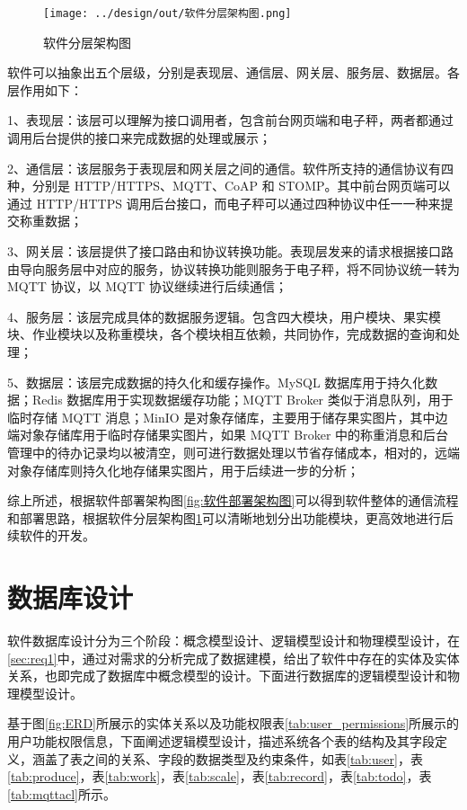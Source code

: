 \begin{figure}[H]
    \centering
    \texttt{[image: ../design/out/软件分层架构图.png]}
    \caption{软件分层架构图}
    \label{fig:软件分层架构图}
\end{figure}

软件可以抽象出五个层级，分别是表现层、通信层、网关层、服务层、数据层。各层作用如下：

1、表现层：该层可以理解为接口调用者，包含前台网页端和电子秤，两者都通过调用后台提供的接口来完成数据的处理或展示；

2、通信层：该层服务于表现层和网关层之间的通信。软件所支持的通信协议有四种，分别是 HTTP/HTTPS、MQTT、CoAP 和 STOMP。其中前台网页端可以通过 HTTP/HTTPS 调用后台接口，而电子秤可以通过四种协议中任一一种来提交称重数据；

3、网关层：该层提供了接口路由和协议转换功能。表现层发来的请求根据接口路由导向服务层中对应的服务，协议转换功能则服务于电子秤，将不同协议统一转为 MQTT 协议，以 MQTT 协议继续进行后续通信；

4、服务层：该层完成具体的数据服务逻辑。包含四大模块，用户模块、果实模块、作业模块以及称重模块，各个模块相互依赖，共同协作，完成数据的查询和处理；

5、数据层：该层完成数据的持久化和缓存操作。MySQL 数据库用于持久化数据；Redis 数据库用于实现数据缓存功能；MQTT Broker 类似于消息队列，用于临时存储 MQTT 消息；MinIO 是对象存储库，主要用于储存果实图片，其中边端对象存储库用于临时存储果实图片，如果 MQTT Broker 中的称重消息和后台管理中的待办记录均以被清空，则可进行数据处理以节省存储成本，相对的，远端对象存储库则持久化地存储果实图片，用于后续进一步的分析；

综上所述，根据软件部署架构图\ref{fig:软件部署架构图}可以得到软件整体的通信流程和部署思路，根据软件分层架构图\ref{fig:软件分层架构图}可以清晰地划分出功能模块，更高效地进行后续软件的开发。

\section{数据库设计}\label{sec:database}

软件数据库设计分为三个阶段：概念模型设计、逻辑模型设计和物理模型设计，在\ref{sec:req1}中，通过对需求的分析完成了数据建模，给出了软件中存在的实体及实体关系，也即完成了数据库中概念模型的设计。下面进行数据库的逻辑模型设计和物理模型设计。

基于图\ref{fig:ERD}所展示的实体关系以及功能权限表\ref{tab:user_permissions}所展示的用户功能权限信息，下面阐述逻辑模型设计，描述系统各个表的结构及其字段定义，涵盖了表之间的关系、字段的数据类型及约束条件，如表\ref{tab:user}，表\ref{tab:produce}，表\ref{tab:work}，表\ref{tab:scale}，表\ref{tab:record}，表\ref{tab:todo}，表\ref{tab:mqttacl}所示。

